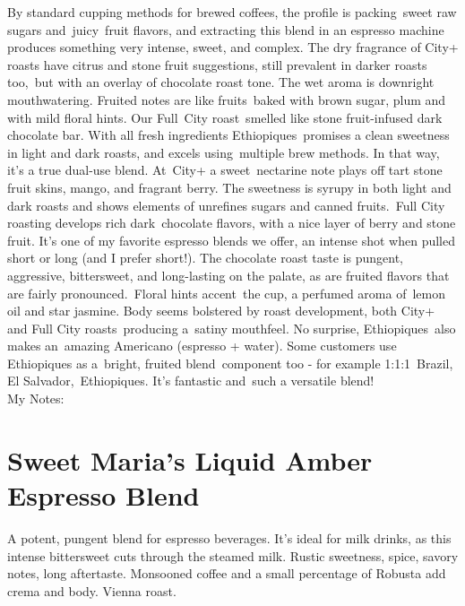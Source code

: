 \documentclass[10pt,twoside,footinclude=true,headinclude=true]{scrbook} %
\begin{document}
By standard cupping methods for brewed coffees, the profile is packing sweet raw sugars and juicy fruit flavors, and extracting this blend in an espresso machine produces something very intense, sweet, and complex. The dry fragrance of City+ roasts have citrus and stone fruit suggestions, still prevalent in darker roasts too, but with an overlay of chocolate roast tone. The wet aroma is downright mouthwatering. Fruited notes are like fruits baked with brown sugar, plum and with mild floral hints. Our Full City roast smelled like stone fruit-infused dark chocolate bar. With all fresh ingredients Ethiopiques promises a clean sweetness in light and dark roasts, and excels using multiple brew methods. In that way, it's a true dual-use blend. At City+ a sweet nectarine note plays off tart stone fruit skins, mango, and fragrant berry. The sweetness is syrupy in both light and dark roasts and shows elements of unrefines sugars and canned fruits. Full City roasting develops rich dark chocolate flavors, with a nice layer of berry and stone fruit. It's one of my favorite espresso blends we offer, an intense shot when pulled short or long (and I prefer short!). The chocolate roast taste is pungent, aggressive, bittersweet, and long-lasting on the palate, as are fruited flavors that are fairly pronounced. Floral hints accent the cup, a perfumed aroma of lemon oil and star jasmine. Body seems bolstered by roast development, both City+ and Full City roasts producing a satiny mouthfeel. No surprise, Ethiopiques also makes an amazing Americano (espresso + water). Some customers use Ethiopiques as a bright, fruited blend component too - for example 1:1:1 Brazil, El Salvador, Ethiopiques. It's fantastic and such a versatile blend! \\
\medskip
\normalsize
My Notes:


\linespread{1.3}
\chapter*{Sweet Maria's Liquid Amber Espresso Blend}
 
\begin{addmargin}[2.2em]{2.2em}
\small
\justify
A potent, pungent blend for espresso beverages. It's ideal for milk drinks, as this intense bittersweet cuts through the steamed milk. Rustic sweetness, spice, savory notes, long aftertaste. Monsooned coffee and a small percentage of Robusta add crema and body. Vienna roast.
\end{addmargin}
\end{document}
